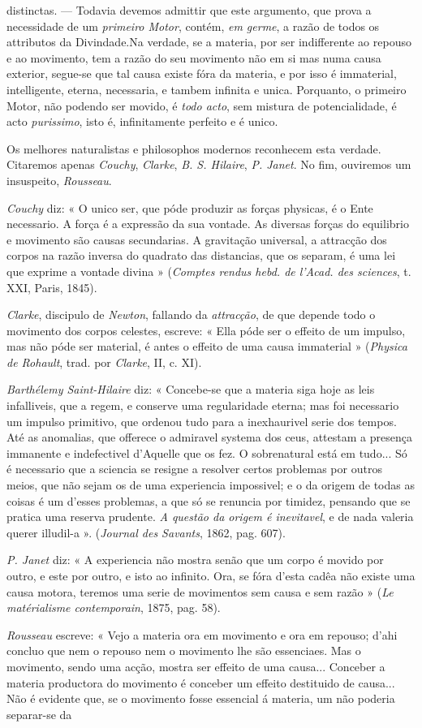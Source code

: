 distinctas. --- Todavia devemos admittir que este argumento, que prova a necessidade de um \emph{primeiro Motor}, contém, \emph{em germe}, a razão de todos os attributos da Divindade.Na verdade, se a materia, por ser indifferente ao repouso e ao movimento, tem a razão do seu movimento não em si mas numa causa exterior, segue-se que tal causa existe fóra da materia, e por isso é immaterial, intelligente, eterna, necessaria, e tambem infinita e unica. Porquanto, o primeiro Motor, não podendo ser movido, é \emph{todo acto}, sem mistura de potencialidade, é acto \emph{purissimo}, isto é, infinitamente perfeito e é unico.\par Os melhores naturalistas e philosophos modernos reconhecem esta verdade. Citaremos apenas \emph{Couchy}, \emph{Clarke}, \emph{B. S. Hilaire}, \emph{P. Janet}. No fim, ouviremos um insuspeito, \emph{Rousseau}.\par \emph{Couchy} diz: « O unico ser, que póde produzir as forças physicas, é o Ente necessario. A força é a expressão da sua vontade. As diversas forças do equilibrio e movimento são causas secundarias. A gravitação universal, a attracção dos corpos na razão inversa do quadrato das distancias, que os separam, é uma lei que exprime a vontade divina » (\emph{Comptes rendus hebd. de l'Acad. des sciences}, t. XXI, Paris, 1845).\par \emph{Clarke}, discipulo de \emph{Newton}, fallando da \emph{attracção}, de que depende todo o movimento dos corpos celestes, escreve: « Ella póde ser o effeito de um impulso, mas não póde ser material, é antes o effeito de uma causa immaterial » (\emph{Physica de Rohault}, trad. por \emph{Clarke}, II, c. XI).\par \emph{Barthélemy Saint-Hilaire} diz: « Concebe-se que a materia siga hoje as leis infalliveis, que a regem, e conserve uma regularidade eterna; mas foi necessario um impulso primitivo, que ordenou tudo para a inexhaurivel serie dos tempos. Até as anomalias, que offerece o admiravel systema dos ceus, attestam a presença immanente e indefectivel d'Aquelle que os fez. O sobrenatural está em tudo... Só é necessario que a sciencia se resigne a resolver certos problemas por outros meios, que não sejam os de uma experiencia impossivel; e o da origem de todas as coisas é um d'esses problemas, a que só se renuncia por timidez, pensando que se pratica uma reserva prudente. \emph{A questão da origem é inevitavel}, e de nada valeria querer illudil-a ». (\emph{Journal des Savants}, 1862, pag. 607).\par \emph{P. Janet} diz: « A experiencia não mostra senão que um corpo é movido por outro, e este por outro, e isto ao infinito. Ora, se fóra d'esta cadêa não existe uma causa motora, teremos uma serie de movimentos sem causa e sem razão » (\emph{Le matérialisme contemporain}, 1875, pag. 58).\par \emph{Rousseau} escreve: « Vejo a materia ora em movimento e ora em repouso; d'ahi concluo que nem o repouso nem o movimento lhe são essenciaes. Mas o movimento, sendo uma acção, mostra ser effeito de uma causa... Conceber a materia productora do movimento é conceber um effeito destituido de causa... Não é evidente que, se o movimento fosse essencial á materia, um não poderia separar-se da 